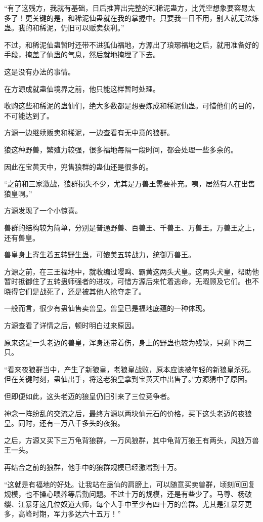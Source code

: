 \begin{this_body}
“有了这残方，我就有基础，日后推算出完整的和稀泥蛊方，比凭空想象要容易太多了！更关键的是，和稀泥仙蛊就在我的掌握中。只要我一日不用，别人就无法炼蛊。我的和稀泥，仍旧可以贩卖获利。”

不过，和稀泥仙蛊暂时还带不进狐仙福地，方源出了琅琊福地之后，就用准备好的手段，掩盖了仙蛊的气息，然后就地掩埋了下去。

这是没有办法的事情。

在方源成就蛊仙境界之前，他只能这样暂时处理。

收购这些和稀泥的蛊仙们，绝大多数都是想要炼成和稀泥仙蛊。可惜他们的目的，不可能达到了。

方源一边继续贩卖和稀泥，一边查看有无中意的狼群。

狼这种野兽，繁殖力较强，很多福地每隔一段时间，都会处理一些多余的。

因此在宝黄天中，兜售狼群的蛊仙还是很多的。

“之前和三家激战，狼群损失不少，尤其是万兽王需要补充。咦，居然有人在出售狼皇啊。”

方源发现了一个小惊喜。

兽群的结构较为简单，分别是普通野兽、百兽王、千兽王、万兽王。万兽王之上，还有兽皇。

兽皇身上寄生着五转野生蛊，可媲美五转战力，统御万兽王。

方源之前，在三王福地中，就收编过嘤鸣、霸黄这两头犬皇。这两头犬皇，帮助他暂时抵御住了五转蛊师强者的进攻，可惜方源后来忙着逃命，无暇顾及它们。也不晓得它们是战死了，还是被其他人抢夺走了。

一般而言，很少有蛊仙售卖兽皇。兽皇已是福地底蕴的一种体现。

方源查看了详情之后，顿时明白过来原因。

原来这是一头老迈的兽皇，浑身还带着伤，身上的野蛊也较为残缺，只剩下两三只。

“看来夜狼群当中，产生了新狼皇，老狼皇战败，原本应该被年轻的新狼皇杀死。但在关键时刻，蛊仙出手，将这老狼皇拿到宝黄天中出售了。”方源猜中了原因。

但即便如此，这头老迈的狼皇仍旧引来了三位竞争者。

神念一阵纷乱的交流之后，最终方源以两块仙元石的价格，买下这头老迈的夜狼皇。同时，还有一万八千多头的夜狼。

之后，方源又买下三万龟背狼群，一万风狼群，其中龟背万狼王有两头，风狼万兽王一头。

再结合之前的狼群，他手中的狼群规模已经激增到十万。

“这就是有福地的好处。让我站在蛊仙的肩膀上，可以随意买卖兽群，顷刻间回复规模，也不操心喂养等后勤问题。不过十万的规模，还是有些少了。马尊、杨破缨、江暴牙这几位奴道大师，每个人手中至少有四十万的兽群。尤其是江暴牙更多，高峰时期，军力多达六十五万！”


\end{this_body}
